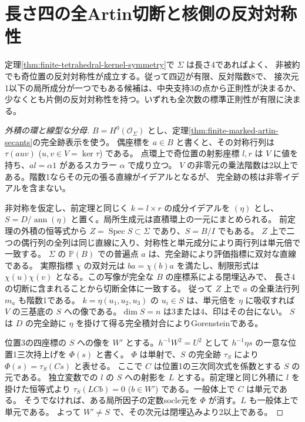\section{長さ四の全Artin切断と核側の反対対称性}
\label{sec:finite-artin-kernel-symmetry}
\begin{theorem}\label{thm:finite-artin-kernel-symmetry}
定理\ref{thm:finite-tetrahedral-kernel-symmetry}で $\Sigma$ は長さ4であればよく、
非被約でも奇位置の反対対称性が成立する。従って四辺が有限、反対階数8で、
接次元1以下の局所成分が一つでもある候補は、中央支持3の点から正則性が決まるか、
少なくとも片側の反対対称性を持つ。いずれも全次数の標準正則性が有限に決まる。
\end{theorem}
\begin{proof}[外積の環と線型な分母]
$B=H^0(\mathcal O_\Sigma)$ とし、定理\ref{thm:finite-marked-artin-secants}の完全跡表示を使う。
偶座標を $a\in B$ と書くと、その対称行列は $\tau(a u v)$ ($u,v\in V=\ker\tau$) である。
点環上で奇位置の射影座標 $l,r$ は $V$ に値を持ち、$al=\alpha 1$ があるスカラー $\alpha$ で成り立つ。
$V$ の非零元の乗法階数は2以上である。階数1ならその元の張る直線がイデアルとなるが、
完全跡の核は非零イデアルを含まない。

非対称を仮定し、前定理と同じく $k=l\times r$ の成分イデアルを $(\eta)$ とし、
$S=D/\operatorname{ann}(\eta)$ と置く。局所生成元は直積環上の一元にまとめられる。
前定理の外積の恒等式から $Z=\operatorname{Spec}S\subset\Sigma$ であり、$S=B/I$ でもある。
$Z$ 上で二つの偶行列の全列は同じ直線に入り、対称性と単元成分により両行列は単元倍で一致する。
$\Sigma$ の $\mathbb P(B)$ での普遍点 $a$ は、完全跡により評価指標に双対な直線である。
実際指標 $\chi$ の双対元は $b a=\chi(b)a$ を満たし、制限形式は
$\chi(u)\chi(v)$ となる。この写像が完全な $B$ の座標系による閉埋込みで、
長さ4の切断に含まれることから切断全体に一致する。
従って $Z$ 上で $a$ の全乗法行列 $m_a$ も階数1である。
$k=\eta (u_1,u_2,u_3)$ の $u_i\in S$ は、単元倍を $\eta$ に吸収すれば
$V$ の三基底の $S$ への像である。$\dim S=n$ は3または4、印はその台にない。
$S$ は $D$ の完全跡に $\eta$ を掛けて得る完全積対合によりGorensteinである。

位置3の四座標の $S$ への像を $W'$ とする。$h^{-1}W^2=U^2$ として
$h^{-1}\eta s$ の一意な位置1三次持上げを $\Phi(s)$ と書く。
$\Phi$ は単射で、$S$ の完全跡 $\tau_S$ により $\Phi(s)=\tau_S(Cs)$ と表せる。
ここで $C$ は位置1の三次同次式を係数とする $S$ の元である。
独立変数での $l$ の $S$ への射影を $L$ とする。前定理と同じ外積に $l$ を掛けた恒等式より
$\tau_S(LC b)=0$ ($b\in W'$) である。一般体上で $C$ は単元である。
そうでなければ、ある局所因子の定数socle元を $\Phi$ が消す。$L$ も一般体上で単元である。
よって $W'\ne S$ で、その次元は閉埋込みより2以上である。


\end{proof}
